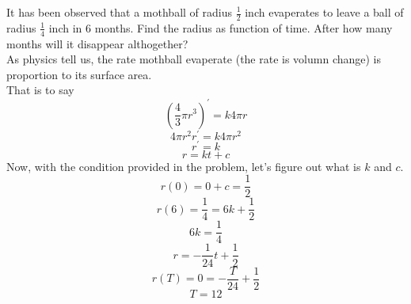 \begin{example}
It has been observed that a mothball of radius $\frac{1}{2}$ inch evaperates to leave a ball of radius $\frac{1}{4}$ inch in 6 months. Find the radius as function of time. After how many months will it disappear althogether?\\
As physics tell us, the rate mothball evaperate (the rate is volumn change) is proportion to its surface area.\\
That is to say
\[(\frac{4}{3}\pi r^3)^\prime=k4\pi r
\] 
\[4\pi r^2r^\prime=k4\pi r^2
\]
\[r^\prime=k
\]
\[r=kt+c
\]
Now, with the condition provided in the problem, let's figure out what is $k$ and $c$.
\[r(0)=0+c=\frac{1}{2}
\]
\[r(6)=\frac{1}{4}=6k+\frac{1}{2}
\]
\[6k=\frac{1}{4}
\]
\[r=-\frac{1}{24}t+\frac{1}{2}
\]
\[r(T)=0=-\frac{T}{24}+\frac{1}{2}
\]
\[T=12
\]


\end{example}




